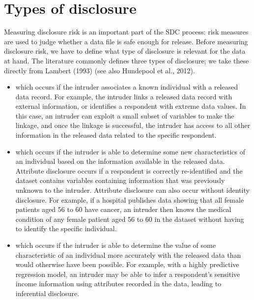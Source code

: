 \documentclass[letterpaper,10pt,english]{sphinxmanual}
\begin{document}
\section{Types of disclosure}
\label{\detokenize{measure_risk:types-of-disclosure}}
Measuring disclosure risk is an important part of the SDC process: risk
measures are used to judge whether a data file is safe enough for
release. Before measuring disclosure risk, we have to define what type
of disclosure is relevant for the data at hand. The literature commonly
defines three types of disclosure; we take these directly from Lambert
(1993) (see also Hundepool et al., 2012).
\begin{itemize}
\item {} 
 which occurs if the intruder associates a
known individual with a released data record. For example, the
intruder links a released data record with external information, or
identifies a respondent with extreme data values. In this case, an
intruder can exploit a small subset of variables to make the linkage,
and once the linkage is successful, the intruder has access to all
other information in the released data related to the specific
respondent.

\item {} 
 which occurs if the intruder is able to
determine some new characteristics of an individual based on the
information available in the released data. Attribute disclosure
occurs if a respondent is correctly re-identified and the dataset
contains variables containing information that was previously unknown
to the intruder. Attribute disclosure can also occur without identity
disclosure. For example, if a hospital publishes data showing that
all female patients aged 56 to 60 have cancer, an intruder then knows
the medical condition of any female patient aged 56 to 60 in the
dataset without having to identify the specific individual.

\item {} 
 which occurs if the intruder is able to
determine the value of some characteristic of an individual more
accurately with the released data than would otherwise have been
possible. For example, with a highly predictive regression model, an
intruder may be able to infer a respondent’s sensitive income
information using attributes recorded in the data, leading to
inferential disclosure.

\end{itemize}
\end{document}
